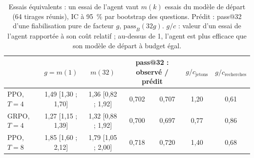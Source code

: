\documentclass[11pt,a4paper]{article}
\begin{document}
\begin{table}[h]\centering\small
\begin{tabular}{lcccccc}\toprule
 & $g = m(1)$ & $m(32)$ & \multicolumn{2}{c}{pass@32 : observé / prédit} & $g/c_{\text{jetons}}$ & $g/c_{\text{recherches}}$\\\midrule
PPO, $T = 4$ & 1,49 [1,30 ; 1,70] & 1,36 [0,82 ; 1,92] & 0,702 & 0,707 & 1,20 & 0,61\\
GRPO, $T = 4$ & 1,27 [1,15 ; 1,39] & 1,32 [0,88 ; 1,92] & 0,700 & 0,697 & 0,77 & 0,86\\
PPO, $T = 8$ & 1,85 [1,60 ; 2,12] & 1,79 [1,05 ; 2,00] & 0,718 & 0,720 & 1,40 & 0,68\\\bottomrule
\end{tabular}
\caption{Essais équivalents : un essai de l'agent vaut $m(k)$ essais du modèle de départ (64 tirages réunis), IC à 95~\% par bootstrap des questions. Prédit : pass@32 d'une fiabilisation pure de facteur $g$, $\text{pass}_B(32 g)$. $g/c$ : valeur d'un essai de l'agent rapportée à son coût relatif ; au-dessus de 1, l'agent est plus efficace que son modèle de départ à budget égal.}\label{tab:equivalents}
\end{table}
\end{document}
